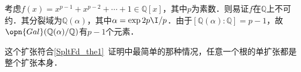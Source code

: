 \begin{example}{}
考虑$f(x)=x^{p-1}+x^{p-2}+\cdots+1\in\mathbb{Q}[x]$，其中$p$为素数．则易证$f$在$\mathbb{Q}$上不可约．其分裂域为$\mathbb{Q}(\alpha)$，其中$\alpha=\exp{2p\I/p}$．由于$[\mathbb{Q}(\alpha):\mathbb{Q}]=p-1$，故$\opn{Gal}(\mathbb{Q}(\alpha)/\mathbb{Q})$有$p-1$个元素．

这个扩张符合\autoref{SpltFd_the1}~证明中最简单的那种情况，任意一个根的单扩张都是整个扩张本身．
\end{example}




































